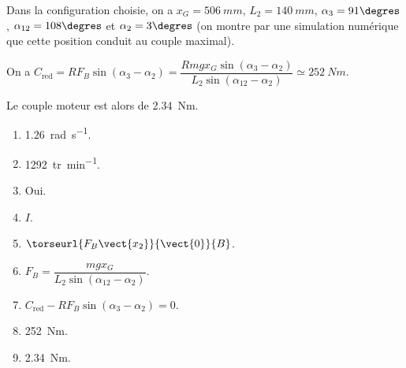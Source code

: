 Dans la configuration choisie, on a $x_G=\SI{506}{mm}$, $L_2 = \SI{140}{mm}$, $\alpha_3=91\degres$, $\alpha_{12}=108\degres$  et $\alpha_2=3\degres$ (on montre par une simulation numérique que cette position conduit au couple maximal).

\ifnormal
{}
\else
\fi

\ifprof
\begin{corrige}
On a $C_{\text{red}}=RF_B \sin \left( \alpha_3 - \alpha_2\right) =\dfrac{ Rmgx_G \sin \left( \alpha_3 - \alpha_2\right)}{L_2  \sin  \left(\alpha_{12}-\alpha_2\right)} \simeq \SI{252}{Nm}$.
\end{corrige}
\else
\fi

\ifprof
\begin{corrige}
Le couple moteur est alors de \SI{2,34}{Nm}.
\end{corrige}
\else
\fi









\ifprof
\else
\ifcolle
\else
\begin{marginfigure}[-4cm]
\begin{solution}
\begin{enumerate}
\item \SI{1,26}{rad.s^{-1}}.
\item \SI{1292}{tr.min^{-1}}.
\item Oui.
\item $I$.
\item  $\torseurl{ F_B\vect{x_{2}}}{\vect{0}}{B}$.
\item $ F_B    = \dfrac{mgx_G}{L_2  \sin  \left(\alpha_{12}-\alpha_2\right)} $.
\item $C_{\text{red}}-RF_B \sin \left( \alpha_3 - \alpha_2\right) = 0$.
\item \SI{252}{Nm}.
\item \SI{2,34}{Nm}.
\end{enumerate}
\end{solution}
\end{marginfigure}
\fi
\fi

